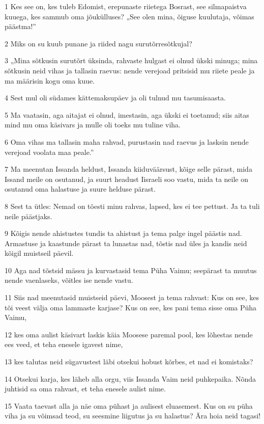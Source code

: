 \par 1 Kes see on, kes tuleb Edomist, erepunaste riietega Bosrast, see silmapaistva kuuega, kes sammub oma jõukülluses? „See olen mina, õiguse kuulutaja, võimas päästma!”
\par 2 Miks on su kuub punane ja riided nagu surutõrresõtkujal?
\par 3 „Mina sõtkusin surutõrt üksinda, rahvaste hulgast ei olnud ükski minuga; mina sõtkusin neid vihas ja tallasin raevus: nende verejoad pritsisid mu riiete peale ja ma määrisin kogu oma kuue.
\par 4 Sest mul oli südames kättemaksupäev ja oli tulnud mu tasumisaasta.
\par 5 Ma vaatasin, aga aitajat ei olnud, imestasin, aga ükski ei toetanud; siis aitas mind mu oma käsivars ja mulle oli toeks mu tuline viha.
\par 6 Oma vihas ma tallasin maha rahvad, purustasin nad raevus ja lasksin nende verejoad voolata maa peale.”
\par 7 Ma meenutan Issanda heldust, Issanda kiiduväärsust, kõige selle pärast, mida Issand meile on osutanud, ja suurt headust Iisraeli soo vastu, mida ta neile on osutanud oma halastuse ja suure helduse pärast.
\par 8 Sest ta ütles: Nemad on tõesti minu rahvas, lapsed, kes ei tee pettust. Ja ta tuli neile päästjaks.
\par 9 Kõigis nende ahistustes tundis ta ahistust ja tema palge ingel päästis nad. Armastuse ja kaastunde pärast ta lunastas nad, tõstis nad üles ja kandis neid kõigil muistseil päevil.
\par 10 Aga nad tõstsid mässu ja kurvastasid tema Püha Vaimu; seepärast ta muutus nende vaenlaseks, võitles ise nende vastu.
\par 11 Siis nad meenutasid muistseid päevi, Moosest ja tema rahvast: Kus on see, kes tõi veest välja oma lammaste karjase? Kus on see, kes pani tema sisse oma Püha Vaimu,
\par 12 kes oma aulist käsivart laskis käia Moosese paremal pool, kes lõhestas nende ees veed, et teha enesele igavest nime,
\par 13 kes talutas neid sügavustest läbi otsekui hobust kõrbes, et nad ei komistaks?
\par 14 Otsekui karja, kes läheb alla orgu, viis Issanda Vaim neid puhkepaika. Nõnda juhtisid sa oma rahvast, et teha enesele aulist nime.
\par 15 Vaata taevast alla ja näe oma pühast ja aulisest eluasemest. Kus on su püha viha ja su võimsad teod, su seesmine liigutus ja su halastus? Ära hoia neid tagasi!
